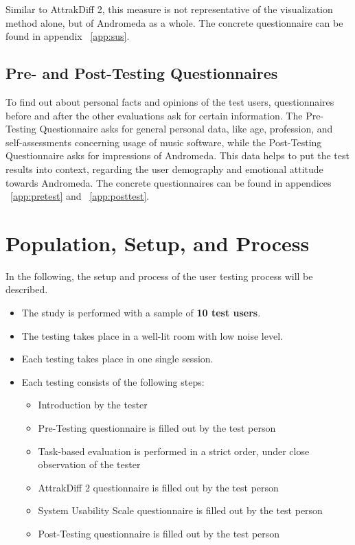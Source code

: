 Similar to AttrakDiff 2, this measure is not representative of the visualization method alone, but of Andromeda as a whole. The concrete questionnaire can be found in appendix ~\ref{app:sus}.

\subsection{Pre- and Post-Testing Questionnaires}

To find out about personal facts and opinions of the test users, questionnaires before and after the other evaluations ask for certain information. The Pre-Testing Questionnaire asks for general personal data, like age, profession, and self-assessments concerning usage of music software, while the Post-Testing Questionnaire asks for impressions of Andromeda. This data helps to put the test results into context, regarding the user demography and emotional attitude towards Andromeda. The concrete questionnaires can be found in appendices ~\ref{app:pretest} and ~\ref{app:posttest}.

\section{Population, Setup, and Process}

In the following, the setup and process of the user testing process will be described.

\begin{itemize}
  \item The study is performed with a sample of \textbf{10 test users}. 
  \item The testing takes place in a well-lit room with low noise level.
  \item Each testing takes place in one single session.
  \item Each testing consists of the following steps:
	\begin{itemize}
		\item Introduction by the tester
		\item Pre-Testing questionnaire is filled out by the test person
		\item Task-based evaluation is performed in a strict order, under close observation of the tester
		\item AttrakDiff 2 questionnaire is filled out by the test person	
		\item System Usability Scale questionnaire is filled out by the test person	
		\item Post-Testing questionnaire is filled out by the test person
	\end{itemize}
\end{itemize}

